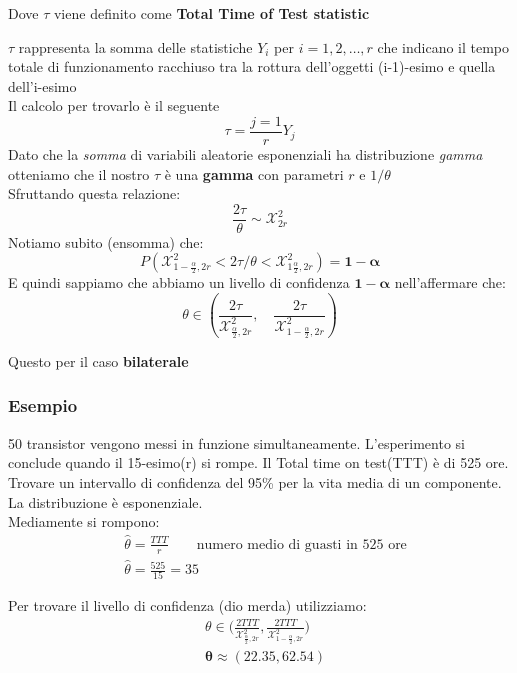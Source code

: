 \documentclass[]{article}
\begin{document}
    \centerline{Dove $\tau$ viene definito come \textbf{Total Time of Test statistic}}
    $\tau$ rappresenta la somma delle statistiche $Y_i$ per $i=1,2,\ldots,r$ che indicano il tempo totale di funzionamento racchiuso tra la rottura dell'oggetti (i-1)-esimo e quella dell'i-esimo \\
    Il calcolo per trovarlo è il seguente 
    \[ \tau = \frac{j=1}{r} Y_j \]
    Dato che la \textit{somma} di variabili aleatorie esponenziali ha distribuzione \textit{gamma} otteniamo che il nostro $\tau$ è una \textbf{gamma} con parametri $r$ e $1 / \theta$ \\
    Sfruttando questa relazione:
    \[ \frac{2 \tau}{\theta} \sim \mathcal{X}^2_{2r} \]
    Notiamo subito (ensomma) che:
    \[ P(\mathcal{X}^2_{1-\frac{\alpha}{2}, 2r} < 2 \tau / \theta < \mathcal{X}^2_{1\frac{\alpha}{2}, 2r}) = \boldsymbol{1 -\alpha} \]
    E quindi sappiamo che abbiamo un livello di confidenza $\boldsymbol{1- \alpha}$ nell'affermare che:
    \[ \theta \in \left( \frac{2 \tau}{\mathcal{X}^2_{\frac{\alpha}{2}, 2r}}, \quad \frac{2\tau}{\mathcal{X}^2_{1- \frac{\alpha}{2}, 2r}} \right) \]
    \centerline{Questo per il caso \textbf{bilaterale}}
\subsubsection{Esempio}
50 transistor vengono messi in funzione simultaneamente. L'esperimento si conclude quando il 15-esimo(r) si rompe.
Il Total time on test(TTT) è di 525 ore. Trovare un intervallo di confidenza del 95\% per la vita media di un componente.
La distribuzione è esponenziale. \\
Mediamente si rompono:
\begin{equation*}
    \begin{split}
        &\hat \theta = \frac{TTT}{r} \quad \quad \text{numero medio di guasti in 525 ore} \\
        &\hat \theta = \frac{525}{15} = 35
    \end{split}
\end{equation*}

Per trovare il livello di confidenza (dio merda) utilizziamo:
\begin{equation*}
    \begin{split}
        &\theta \in \Big(\frac{2TTT}{\mathcal{X}^2_{\frac{\alpha}{2},2r}},\frac{2TTT}{\mathcal{X}^2_{1-\frac{\alpha}{2},2r}}   \Big) \\
        &\boldsymbol{\theta \approx (22.35, 62.54)}
    \end{split}
\end{equation*}
\end{document}
